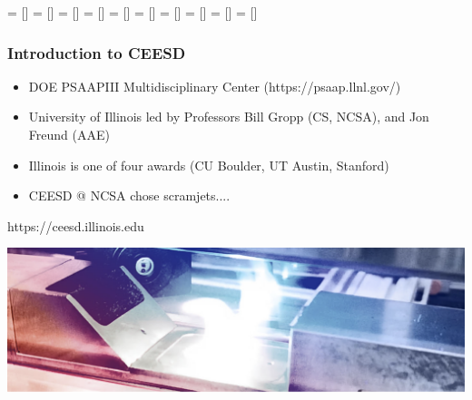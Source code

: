    = []
   = []
     = []
      = []
     = []
   = []
     = []
   = []
       = []
 = []
\newcommand{\softwaredeps}{
  \tikzstyle{every path} = [line width=0.3pt,black!70]
  \tikzstyle{every node} = [scale=1.5,IllinoisBlue, line width=1pt]
  \begin{tikzpicture}[>=latex',line join=bevel,scale=0.34,
                      transform shape]
      
  \end{tikzpicture}
}
%  
\begin{frame}\frametitle{Introduction to CEESD}
\vspace{10pt}
\begin{minipage}[t][0.3\textheight][t]{\textwidth}
\begin{multicols}{2}
\begin{itemize}
\item DOE PSAAPIII Multidisciplinary Center (https://psaap.llnl.gov/)
\item University of Illinois led by Professors Bill Gropp (CS, NCSA), and Jon Freund (AAE)
\columnbreak
\item Illinois is one of four awards (CU Boulder, UT Austin, Stanford)
\item CEESD @ NCSA chose scramjets....
\end{itemize}
\end{multicols}
\end{minipage}
\vspace{-10pt}
\begin{center}
https://ceesd.illinois.edu
\end{center}
\includegraphics[width=\textwidth]{Figures/mtc/ceesd_actii.png}
\end{frame}

